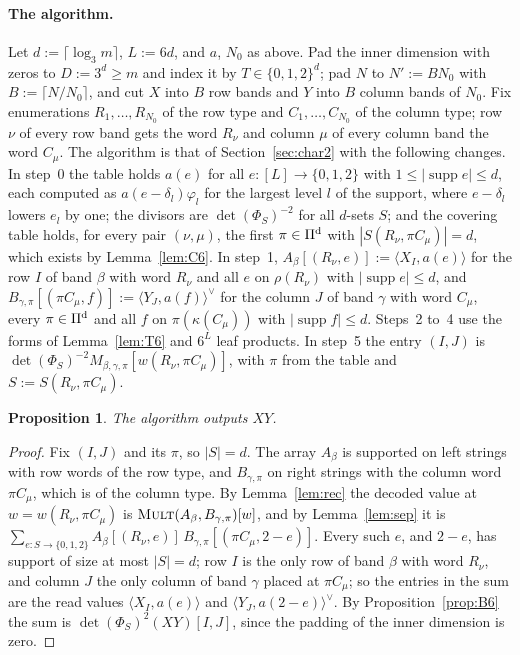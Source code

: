\documentclass[11pt]{article}
\newtheorem{proposition}[theorem]{Proposition}
\theoremstyle{definition}
\theoremstyle{remark}
\newcommand{\Mult}{\textnormal{\textsc{Mult}}}
\newcommand{\Nz}{N_0}
\newcommand{\pairL}[2]{\langle #1,#2\rangle}
\newcommand{\pairR}[2]{\langle #1,#2\rangle^{\vee}}
\begin{document}
\paragraph{The algorithm.} Let $d:=\lceil\log_3m\rceil$, $L:=6d$, and $a$, $\Nz$ as above. Pad the inner dimension with zeros to $D:=3^d\ge m$ and index it by $T\in\{0,1,2\}^d$; pad $N$ to $N':=B\Nz$ with $B:=\lceil N/\Nz\rceil$, and cut $X$ into $B$ row bands and $Y$ into $B$ column bands of $\Nz$. Fix enumerations $R_1,\dots,R_{\Nz}$ of the row type and $C_1,\dots,C_{\Nz}$ of the column type; row $\nu$ of every row band gets the word $R_\nu$ and column $\mu$ of every column band the word $C_\mu$. The algorithm is that of Section~\ref{sec:char2} with the following changes. In step~0 the table holds $a(e)$ for all $e:[L]\to\{0,1,2\}$ with $1\le|\operatorname{supp}e|\le d$, each computed as $a(e-\delta_l)\varphi_l$ for the largest level $l$ of the support, where $e-\delta_l$ lowers $e_l$ by one; the divisors are $\det(\Phi_S)^{-2}$ for all $d$-sets $S$; and the covering table holds, for every pair $(\nu,\mu)$, the first $\pi\in\Pi^{\rm d}$ with $|S(R_\nu,\pi C_\mu)|=d$, which exists by Lemma~\ref{lem:C6}. In step~1, $A_\beta[(R_\nu,e)]:=\pairL{X_I}{a(e)}$ for the row $I$ of band $\beta$ with word $R_\nu$ and all $e$ on $\rho(R_\nu)$ with $|\operatorname{supp}e|\le d$, and $B_{\gamma,\pi}[(\pi C_\mu,f)]:=\pairR{Y_J}{a(f)}$ for the column $J$ of band $\gamma$ with word $C_\mu$, every $\pi\in\Pi^{\rm d}$ and all $f$ on $\pi(\kappa(C_\mu))$ with $|\operatorname{supp}f|\le d$. Steps~2 to~4 use the forms of Lemma~\ref{lem:T6} and $6^L$ leaf products. In step~5 the entry $(I,J)$ is $\det(\Phi_S)^{-2}M_{\beta,\gamma,\pi}[w(R_\nu,\pi C_\mu)]$, with $\pi$ from the table and $S:=S(R_\nu,\pi C_\mu)$.

\begin{proposition}\label{prop:correct6}
The algorithm outputs $XY$.
\end{proposition}

\begin{proof}
Fix $(I,J)$ and its $\pi$, so $|S|=d$. The array $A_\beta$ is supported on left strings with row words of the row type, and $B_{\gamma,\pi}$ on right strings with the column word $\pi C_\mu$, which is of the column type. By Lemma~\ref{lem:rec} the decoded value at $w=w(R_\nu,\pi C_\mu)$ is $\Mult(A_\beta,B_{\gamma,\pi})[w]$, and by Lemma~\ref{lem:sep} it is $\sum_{e:S\to\{0,1,2\}}A_\beta[(R_\nu,e)]\,B_{\gamma,\pi}[(\pi C_\mu,2-e)]$. Every such $e$, and $2-e$, has support of size at most $|S|=d$; row $I$ is the only row of band $\beta$ with word $R_\nu$, and column $J$ the only column of band $\gamma$ placed at $\pi C_\mu$; so the entries in the sum are the read values $\pairL{X_I}{a(e)}$ and $\pairR{Y_J}{a(2-e)}$. By Proposition~\ref{prop:B6} the sum is $\det(\Phi_S)^2(XY)[I,J]$, since the padding of the inner dimension is zero.
\end{proof}
\end{document}
